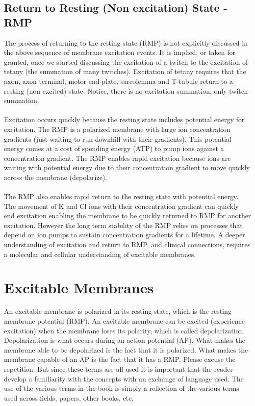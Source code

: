 \subsection{Return to Resting (Non excitation) State - RMP}
The process of returning to the resting state (RMP) is not explicitly discussed in the above sequence of membrane excitation events. It is implied, or taken for granted, once we started discussing the excitation of a twitch to the excitation of tetany (the summation of many twitches). Excitation of tetany requires that the axon, axon terminal, motor end plate, sarcolemma and T-tubule return to a resting (non excited) state. Notice, there is no excitation summation, only twitch summation.
\paragraph{}
Excitation occurs quickly because the resting state includes potential energy for excitation. The RMP is a polarized membrane with large ion concentration gradients (just waiting to run downhill with their gradients). This potential energy comes at a cost of spending energy (ATP) to pump ions against a concentration gradient. The RMP enables rapid excitation because ions are waiting with potential energy due to their concentration gradient to move quickly across the membrane (depolarize). 
\paragraph{}
The RMP also enables rapid return to the resting state with potential energy. The movement of K and Cl ions with their concentration gradient can quickly end excitation enabling the membrane to be quickly returned to RMP for another excitation. However the long term stability of the RMP relies on processes that depend on ion pumps to sustain concentration gradients for a lifetime.\footnotemark{}
A deeper understanding of excitation and return to RMP, and clinical connections, requires a molecular and cellular understanding of excitable membranes.

\section{Excitable Membranes}

An excitable membrane is polarized in its resting state, which is the resting membrane potential (RMP). An excitable membrane can be excited (experience excitation) when the membrane loses its polarity, which is called depolarization. Depolarization is what occurs during an action potential (AP). What makes the membrane able to be depolarized is the fact that it is polarized. What makes the membrane capable of an AP is the fact that it has a RMP. Please excuse the repetition. But since these terms are all used it is important that the reader develop a familiarity with the concepts with an exchange of language used. The use of the various terms in the book is simply a reflection of the various terms used across fields, papers, other books, etc.

